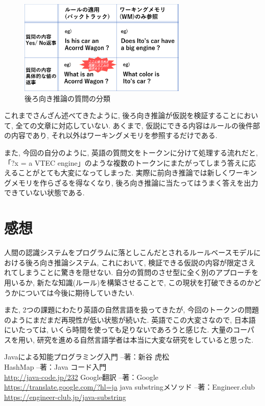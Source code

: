 \documentclass[uplatex,12pt]{jsarticle}
\begin{document}
\begin{figure}[htbp]
 \begin{center}
  \includegraphics[width = 8cm, pagebox = cropbox, clip]{images/後ろ向き推論の質問の分類.pdf}
 \end{center}
 \caption[]{後ろ向き推論の質問の分類}\label{fig:fig1.1}
\end{figure}

これまでさんざん述べてきたように, 後ろ向き推論が仮説を検証することにおいて, 全ての文章に対応していない. あくまで, 仮説にできる内容はルールの後件部の内容であり, それ以外はワーキングメモリを参照するだけである.

また, 今回の自分のように, 英語の質問文をトークンに分けて処理する流れだと, 「?x = a VTEC engine」のような複数のトークンにまたがってしまう答えに応えることがとても大変になってしまった. 実際に前向き推論では新しくワーキングメモリを作らざるを得なくなり, 後ろ向き推論に当たってはうまく答えを出力できていない状態である.

\section{感想}
人間の認識システムをプログラムに落としこんだとされるルールベースモデルにおける後ろ向き推論システム, これにおいて, 検証できる仮説の内容が限定さえれてしまうことに驚きを隠せない. 自分の質問のさせ型に全く別のアプローチを用いるか, 新たな知識(ルール)を構築させることで, この現状を打破できるのかどうかについては今後に期待していきたい. 

また, 2つの課題にわたり英語の自然言語を扱ってきたが, 今回のトークンの問題のようにまだまだ再現性が低い状態が続いた. 英語でこの大変さなので, 日本語にいたっては, いくら時間を使っても足りないであろうと感じた. 大量のコーパスを用い, 研究を進める自然言語学者は本当に大変な研究をしていると思った.

\begin{thebibliography}{99}
 Javaによる知能プログラミング入門 --著：新谷 虎松 \\
 HashMap --著：Java コード入門 \\
\url{http://java-code.jp/232}
 Google翻訳 --著：Google \\
\url{https://translate.google.com/?hl=ja}
 java substringメソッド --著：Engineer.club \\
\url{https://engineer-club.jp/java-substring}
\end{thebibliography}
\end{document}
